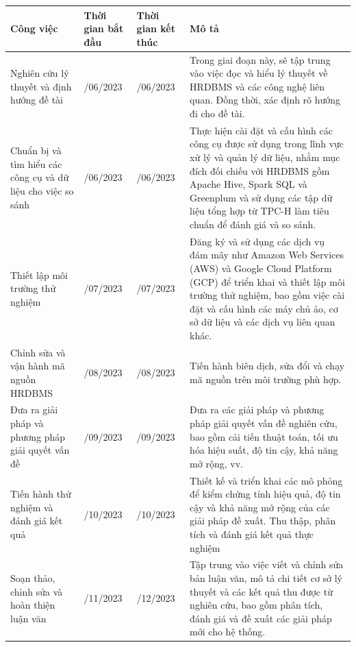 \documentclass{article}[14pt]
\begin{document}
{\begin{longtable}{|>{\raggedright\arraybackslash}p{4cm}|>{\raggedright\arraybackslash}p{3cm}|>{\raggedright\arraybackslash}p{3cm}|>{\raggedright\arraybackslash}p{5cm}|}
\hline
\textbf{Công việc} & \textbf{Thời gian bắt đầu} & \textbf{Thời gian kết thúc} & \textbf{Mô tả} \\
\hline
Nghiên cứu lý thuyết và định hướng đề tài & 01/06/2023 & 15/06/2023 & Trong giai đoạn này, sẽ tập trung vào việc đọc và hiểu lý thuyết về HRDBMS và các công nghệ liên quan. Đồng thời, xác định rõ hướng đi cho đề tài. \\
\hline
Chuẩn bị và tìm hiểu các công cụ và dữ liệu cho việc so sánh & 16/06/2023 & 30/06/2023 & Thực hiện cài đặt và cấu hình các công cụ được sử dụng trong lĩnh vực xử lý và quản lý dữ liệu, nhằm mục đích đối chiếu với HRDBMS gồm Apache Hive, Spark SQL và Greenplum và sử dụng các tập dữ liệu tổng hợp từ TPC-H làm tiêu chuẩn để đánh giá và so sánh. \\
\hline
Thiết lập môi trường thử nghiệm & 01/07/2023 & 15/07/2023 & Đăng ký và sử dụng các dịch vụ đám mây như Amazon Web Services (AWS) và Google Cloud Platform (GCP) để triển khai và thiết lập môi trường thử nghiệm, bao gồm việc cài đặt và cấu hình các máy chủ ảo, cơ sở dữ liệu và các dịch vụ liên quan khác. \\
\hline
Chỉnh sửa và vận hành mã nguồn HRDBMS & 01/08/2023 & 31/08/2023 & Tiến hành biên dịch, sửa đổi và chạy mã nguồn trên môi trường phù hợp. \\
\hline
Đưa ra giải pháp và phương pháp giải quyết vấn đề & 01/09/2023 & 30/09/2023 & Đưa ra các giải pháp và phương pháp giải quyết vấn đề nghiên cứu, bao gồm cải tiến thuật toán, tối ưu hóa hiệu suất, độ tin cậy, khả năng mở rộng, vv. \\
\hline
Tiến hành thử nghiệm và đánh giá kết quả & 01/10/2023 & 31/10/2023 & Thiết kế và triển khai các mô phỏng để kiểm chứng tính hiệu quả, độ tin cậy và khả năng mở rộng của các giải pháp đề xuất. Thu thập, phân tích và đánh giá kết quả thực nghiệm \\
\hline
Soạn thảo, chỉnh sửa và hoàn thiện luận văn & 01/11/2023 & 01/12/2023 & Tập trung vào việc viết và chỉnh sửa bản luận văn, mô tả chi tiết cơ sở lý thuyết và các kết quả thu được từ nghiên cứu, bao gồm phân tích, đánh giá và đề xuất các giải pháp mới cho hệ thống. \\
\hline
\end{longtable}

    
    
    
    \pagebreak 
    
    
    \nocite{*}

}
\end{document}
